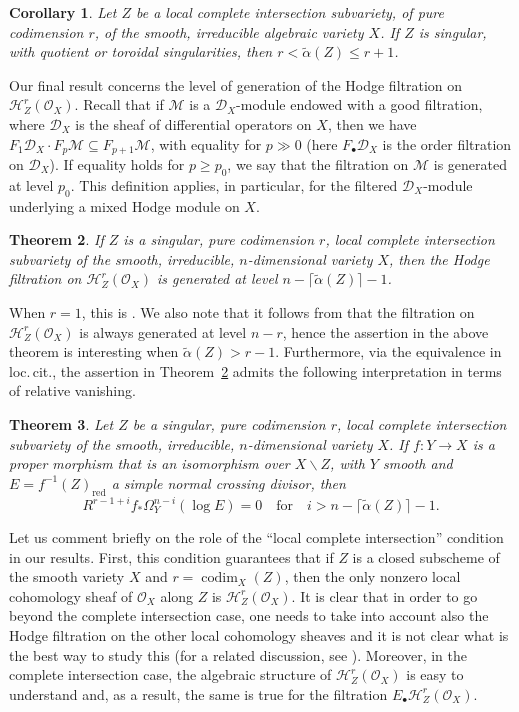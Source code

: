 \documentclass[11pt]{article}
\numberwithin{equation}{section}
\newcommand{\sbullet}{{\scriptscriptstyle\bullet}}
\newcommand{\DXmodule}{$\cD_X$\nobreakdash-mod\-ule\xspace}
\theoremstyle{plain}
\newtheorem{thm}{Theorem}[section]
\newtheorem{cor}[thm]{Corollary}
\theoremstyle{definition}
\newcommand\cD{\mathcal{D}}
\newcommand\cH{\mathcal{H}}
\newcommand\cO{\mathcal{O}}
\newcommand\cM{\mathcal{M}}
\newcommand\cH{\mathcal{H}}
\newcommand\cO{\mathcal{O}}
\DeclareMathOperator{\codim}{codim}
\begin{document}
\begin{cor}
Let $Z$ be a local complete intersection subvariety, of pure codimension $r$, of the smooth, irreducible algebraic variety $X$. If $Z$ is singular,
with quotient or toroidal singularities, then $r<\widetilde{\alpha}(Z)\leq r+1$.
\end{cor}

Our final result concerns the level of generation of the Hodge filtration on
$\cH^r_Z(\cO_X)$. Recall that if $\cM$ is a \DXmodule endowed with a good filtration, where $\cD_X$ is the sheaf of differential operators on $X$, then we have
$F_1\cD_X\cdot F_p\cM\subseteq F_{p+1}\cM$, with equality for $p\gg 0$ (here $F_{\sbullet}\cD_X$ is the order filtration on $\cD_X$). If equality
holds for $p\geq p_0$, we say that the filtration on $\cM$ is generated at level $p_0$. This definition applies, in particular, for the filtered \DXmodule
underlying a mixed Hodge module on $X$.

\begin{thm}\label{thm4_intro}
If $Z$ is a singular, pure codimension $r$, local complete intersection subvariety of the smooth, irreducible, $n$-dimensional variety $X$, then the Hodge filtration
on $\cH^r_Z(\cO_X)$ is generated at level $n-\lceil\widetilde{\alpha}(Z)\rceil-1$.
\end{thm}

When $r=1$, this is \cite[Th.\,A]{MP0}.
We also note that it follows from \cite[Th.\,4.2]{MP1} that the filtration on $\cH^r_Z(\cO_X)$ is always generated at level $n-r$, hence the assertion in the above theorem is interesting when $\widetilde{\alpha}(Z)>r-1$. Furthermore, via the equivalence in loc.\,cit., the assertion in Theorem~\ref{thm4_intro}
admits the following interpretation in terms of relative vanishing.\enlargethispage{\baselineskip}%

\begin{thm}\label{thm5_intro}
Let $Z$ be a singular, pure codimension $r$, local complete intersection subvariety of the smooth, irreducible, $n$-dimensional variety $X$. If $f\colon Y\to X$
is a proper morphism that is an isomorphism over $X\smallsetminus Z$, with $Y$ smooth and $E=f^{-1}(Z)_\mathrm{red}$ a simple normal crossing divisor, then
\[R^{r-1+i}f_*\Omega_Y^{n-i}(\log E)=0\quad\text{for}\quad i>n-\lceil\widetilde{\alpha}(Z)\rceil-1.\]
\end{thm}

Let us comment briefly on the role of the ``local complete intersection'' condition in our results. First, this condition guarantees that if $Z$ is a closed subscheme
of the smooth variety $X$ and $r=\codim_X(Z)$, then the only nonzero local cohomology sheaf of $\cO_X$ along $Z$ is $\cH^r_Z(\cO_X)$. It is clear that in order to
go beyond the complete intersection case, one needs to take into account also the Hodge filtration on the other local cohomology sheaves and it is not clear what is the best way to study this (for a related discussion,
see \cite[\S 3]{MP1}). Moreover, in the complete intersection case, the
algebraic structure of $\cH^r_Z(\cO_X)$ is easy to understand and, as a result, the same is true for the filtration $E_{\sbullet}\cH^r_Z(\cO_X)$.
\end{document}

